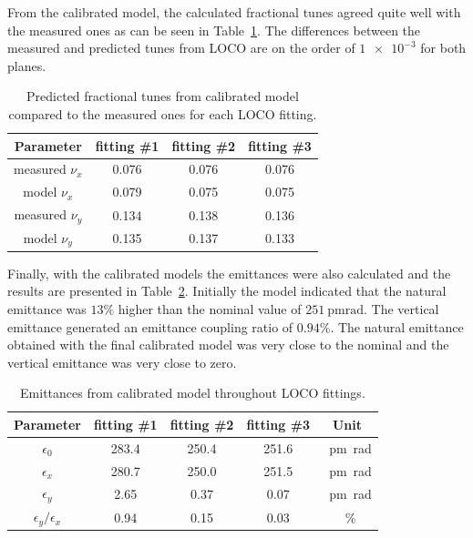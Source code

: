 From the calibrated model, the calculated fractional tunes agreed quite well with the measured ones as can be seen in Table~\ref{tab:calibrated_tunes}. The differences between the measured and predicted tunes from LOCO are on the order of $\num{1e-3}$ for both planes.
\begin{table}
    \centering
    \caption{Predicted fractional tunes from calibrated model compared to the measured ones for each LOCO fitting.}
    \label{tab:calibrated_tunes}
    \begin{tabular}{cccc}
        \toprule\toprule
        Parameter & fitting \#1 & fitting \#2 & fitting \#3 \\
        \hline
        measured $\nu_x$ & \num{0.076} & \num{0.076} & \num{0.076} \\
        model $\nu_x$ & \num{0.079} & \num{0.075} & \num{0.075}  \\
        \hline
        measured $\nu_y$ & \num{0.134} & \num{0.138} & \num{0.136} \\
        model $\nu_y$ & \num{0.135} & \num{0.137} & \num{0.133}  \\
        \bottomrule\bottomrule
    \end{tabular}
\end{table}

Finally, with the calibrated models the emittances were also calculated and the results are presented in Table~\ref{tab:calibrated_emittances}. Initially the model indicated that the natural emittance was $13\%$ higher than the nominal value of $\SI{251}{\pico\meter\radian}$. The vertical emittance generated an emittance coupling ratio of $0.94\%$. The natural emittance obtained with the final calibrated model was very close to the nominal and the vertical emittance was very close to zero.
\begin{table}
    \centering
    \caption{Emittances from calibrated model throughout LOCO fittings.}
    \label{tab:calibrated_emittances}
    \begin{tabular}{ccccc}
        \toprule\toprule
        Parameter & fitting \#1 & fitting \#2 & fitting \#3 & Unit \\
        \hline
        $\epsilon_0$ & \num{283.4} & \num{250.4} & \num{251.6} & \SI{}{\pico\meter\radian}  \\
        $\epsilon_x$ & \num{280.7} & \num{250.0} & \num{251.5} & \SI{}{\pico\meter\radian} \\
        $\epsilon_y$ &  \num{2.65} &  \num{0.37} & \num{0.07} & \SI{}{\pico\meter\radian}  \\
        $\epsilon_y/\epsilon_x$ &  \num{0.94} &  \num{0.15} & \num{0.03} & \SI{}{\%} \\
        \bottomrule\bottomrule
    \end{tabular}
\end{table}
